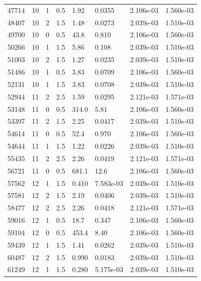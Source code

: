 \documentclass[preview]{standalone}
\begin{document}
{{{\begin{tabular}{L{1.2cm}C{1.2cm} C{0.3cm}C{0.5cm} C{1.4cm}C{1.4cm} C{1.4cm}C{1.4cm}}
  47714  &    10  & 1     & 0.5 &  1.92  & 0.0355  & 2.106e-03 &  1.560e-03   \\ 
  48407  &    10  & 2     & 1.5 &  1.48  & 0.0273  & 2.039e-03 &  1.510e-03   \\ 
  49700  &    10  & 0     & 0.5 &  43.8  & 0.810  & 2.106e-03 &  1.560e-03   \\ 
  50266  &    10  & 1     & 1.5 &  5.86  & 0.108  & 2.039e-03 &  1.510e-03   \\ 
  51003  &    10  & 2     & 1.5 &  1.27  & 0.0235  & 2.039e-03 &  1.510e-03   \\ 
  51486  &    10  & 1     & 0.5 &  3.83  & 0.0709  & 2.106e-03 &  1.560e-03   \\ 
  52131  &    10  & 1     & 1.5 &  3.83  & 0.0708  & 2.039e-03 &  1.510e-03   \\ 
  52944  &    11  & 2     & 2.5 &  1.59  & 0.0295  & 2.121e-03 &  1.571e-03   \\ 
  53148  &    11  & 0     & 0.5 &  314.0  & 5.81  & 2.106e-03 &  1.560e-03   \\ 
  53397  &    11  & 2     & 1.5 &  2.25  & 0.0417  & 2.039e-03 &  1.510e-03   \\ 
  54614  &    11  & 0     & 0.5 &  52.4  & 0.970  & 2.106e-03 &  1.560e-03   \\ 
  54644  &    11  & 1     & 1.5 &  1.22  & 0.0226  & 2.039e-03 &  1.510e-03   \\ 
  55435  &    11  & 2     & 2.5 &  2.26  & 0.0419  & 2.121e-03 &  1.571e-03   \\ 
  56721  &    11  & 0     & 0.5 &  681.1  & 12.6  & 2.106e-03 &  1.560e-03   \\ 
  57562  &    12  & 1     & 1.5 &  0.410  & 7.583e-03  & 2.039e-03 &  1.510e-03   \\ 
  57581  &    12  & 2     & 1.5 &  2.19  & 0.0406  & 2.039e-03 &  1.510e-03   \\ 
  58477  &    12  & 2     & 2.5 &  2.26  & 0.0418  & 2.121e-03 &  1.571e-03   \\ 
  59016  &    12  & 1     & 0.5 &  18.7  & 0.347  & 2.106e-03 &  1.560e-03   \\ 
  59104  &    12  & 0     & 0.5 &  453.4  & 8.40  & 2.106e-03 &  1.560e-03   \\ 
  59439  &    12  & 1     & 1.5 &  1.41  & 0.0262  & 2.039e-03 &  1.510e-03   \\ 
  60487  &    12  & 2     & 1.5 &  0.990  & 0.0183  & 2.039e-03 &  1.510e-03   \\ 
  61249  &    12  & 1     & 1.5 &  0.280  & 5.175e-03  & 2.039e-03 &  1.510e-03   \\ 

\end{tabular}}}}
\end{document}

